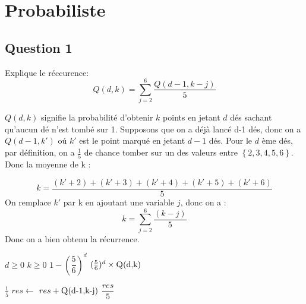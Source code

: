 \documentclass[12pt,a4paper]{article}
\begin{document}
\newpage

\section{Probabiliste}

\subsection{Question 1}
Explique le r\'eccurence:
\begin{equation}\nonumber
Q(d,k)=\sum\limits_{j=2}^{6}\frac{Q(d-1,k-j)}{5}
\end{equation}

\(Q(d,k)\) signifie la probabilit\'e d'obtenir $k$ points en jetant $d$ d\'es sachant qu'aucun dé n'est tomb\'e sur 1. Supposons que on a d\'ej\`a lanc\'e d-1 d\'es, donc on a
\(Q(d-1,k')\) o\'u \(k'\) est le point marqu\'e en jetant $d-1$ d\'es. Pour le $d$ \`eme d\'es, par définition, on a \(\frac{1}{5}\) de chance tomber sur un des valeurs entre  \(\left\{2,3,4,5,6\right\}\). Donc la moyenne de k :

\begin{equation}\nonumber
k=\frac{(k'+2)+(k'+3)+(k'+4)+(k'+5)+(k'+6)}{5}
\end{equation}
On remplace $k'$ par k en ajoutant une variable $j$, donc on a :
\begin{equation}\nonumber
k=\sum\limits_{j=2}^{6}\frac{(k-j)}{5}
\end{equation}
\medskip
Donc on a bien obtenu la récurrence.

\begin{algorithm}
\caption{Probabilite}
\begin{algorithmic}[1]
\Require $d \geq 0$ \AND $k \geq 0$
    	\State \Return $1-(\dfrac{5}{6})^{d}$
    \EndIf 
    	\State {}
    \EndIf
    \State \Return $(\frac{5}{6})^{d} \times \Call{Q}{$d$,$k$}$
\EndFunction

\Statex
{}
        \State {}
	\EndIf    
        \State \Return $\frac{1}{5}$
    \EndIf
            \State $res \gets $ $res +\Call{Q}{$d-1$, $k-j$}$
    \EndFor
    \State \Return $\dfrac{res}{5}$

\EndFunction
\end{algorithmic}
\end{algorithm}
\end{document}
